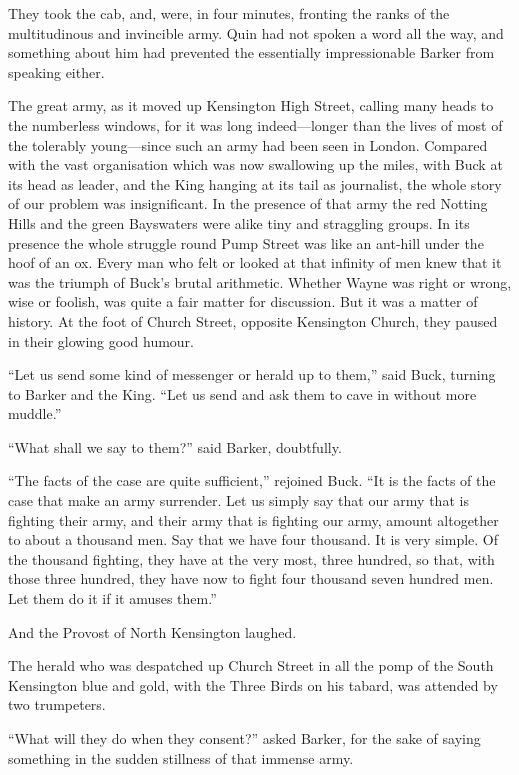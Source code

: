 \documentclass{book}
\begin{document}
They took the cab, and, were, in four minutes, fronting the ranks of the multitudinous and invincible army. Quin had not spoken a word all the way, and something about him had prevented the essentially impressionable Barker from speaking either.

The great army, as it moved up Kensington High Street, calling many heads to the numberless windows, for it was long indeed—longer than the lives of most of the tolerably young—since such an army had been seen in London. Compared with the vast organisation which was now swallowing up the miles, with Buck at its head as leader, and the King hanging at its tail as journalist, the whole story of our problem was insignificant. In the presence of that army the red Notting Hills and the green Bayswaters were alike tiny and straggling groups. In its presence the whole struggle round Pump Street was like an ant-hill under the hoof of an ox. Every man who felt or looked at that infinity of men knew that it was the triumph of Buck’s brutal arithmetic. Whether Wayne was right or wrong, wise or foolish, was quite a fair matter for discussion. But it was a matter of history. At the foot of Church Street, opposite Kensington Church, they paused in their glowing good humour.

“Let us send some kind of messenger or herald up to them,” said Buck, turning to Barker and the King. “Let us send and ask them to cave in without more muddle.”

“What shall we say to them?” said Barker, doubtfully.

“The facts of the case are quite sufficient,” rejoined Buck. “It is the facts of the case that make an army surrender. Let us simply say that our army that is fighting their army, and their army that is fighting our army, amount altogether to about a thousand men. Say that we have four thousand. It is very simple. Of the thousand fighting, they have at the very most, three hundred, so that, with those three hundred, they have now to fight four thousand seven hundred men. Let them do it if it amuses them.”

And the Provost of North Kensington laughed.

The herald who was despatched up Church Street in all the pomp of the South Kensington blue and gold, with the Three Birds on his tabard, was attended by two trumpeters.

“What will they do when they consent?” asked Barker, for the sake of saying something in the sudden stillness of that immense army.
\end{document}
